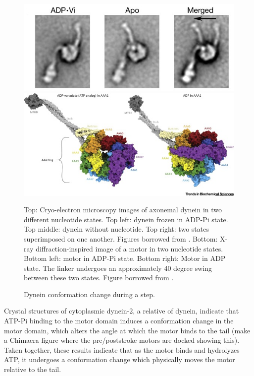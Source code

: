 \documentclass[
11pt, %
english, %
singlespacing, %
headsepline, %
chapterinoneline, %
]{MastersDoctoralThesis} %
\begin{document}
\begin{figure}[h]
  \centering
  \includegraphics[width=.65\textwidth,keepaspectratio]{../../figures/burgess-dynein-angles}\\
  \hspace{1cm}
  \includegraphics[width=.85\textwidth,keepaspectratio]{../../figures/linker-swing}
  \caption{Dynein conformation change during a step.}{Top: Cryo-electron microscopy images of axonemal dynein in two different nucleotide states. Top left: dynein frozen in ADP-Pi state. Top middle: dynein without nucleotide. Top right: two states superimposed on one another. Figures borrowed from \cite{burgess-paper}. Bottom: X-ray diffraction-inspired image of a motor in two nucleotide states. Bottom left: motor in ADP-Pi state. Bottom right: Motor in ADP state. The linker undergoes an approximately 40 degree swing between these two states. Figure borrowed from \cite{bhabha-paper}.}
  \label{fig:cryo-em-angles}
\end{figure}

Crystal structures of cytoplasmic dynein-2, a relative of dynein, indicate that ATP-Pi binding to the motor domain induces a conformation change in the motor domain, which alters the angle at which the motor binds to the tail \cite{carter-paper} (make a Chimaera figure where the pre/poststroke motors are docked showing this). Taken together, these results indicate that as the motor binds and hydrolyzes ATP, it undergoes a conformation change which physically moves the motor relative to the tail.\\

\end{document}
